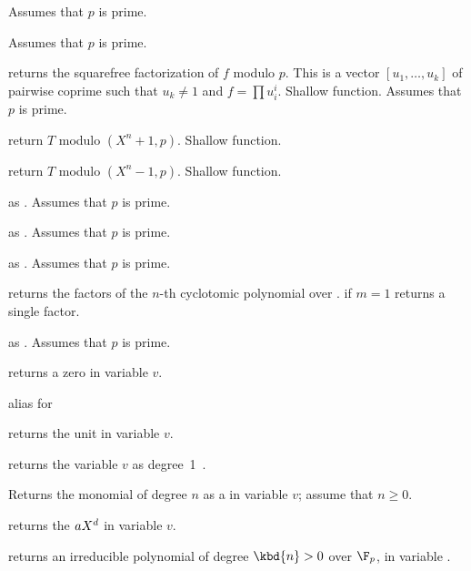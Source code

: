  Assumes that $p$ is prime.

 Assumes that $p$ is prime.


 returns the squarefree
factorization of $f$ modulo $p$. This is a vector $[u_1,\dots,u_k]$
of pairwise coprime  such that $u_k \neq 1$ and $f = \prod u_i^i$.
Shallow function. Assumes that $p$ is prime.


 return $T$ modulo
$(X^n + 1, p)$. Shallow function.

 return $T$ modulo
$(X^n - 1, p)$. Shallow function.

 as . Assumes that $p$
is prime.

 as
. Assumes that $p$ is prime.

 as .
Assumes that $p$ is prime.

 returns the factors
of the $n$-th cyclotomic polynomial over . if $m=1$ returns
a single factor.

 as .
Assumes that $p$ is prime.


 returns a zero  in variable $v$.

 alias for 

 returns the unit  in variable $v$.

 returns the variable $v$ as degree~1~.

 Returns the monomial of degree $n$ as
a  in variable $v$; assume that $n \geq 0$.

 returns the 
$a\*X^d$ in variable $v$.

 returns an irreducible
polynomial of degree $\kbd{n} > 0$ over $\F_p$, in variable .

